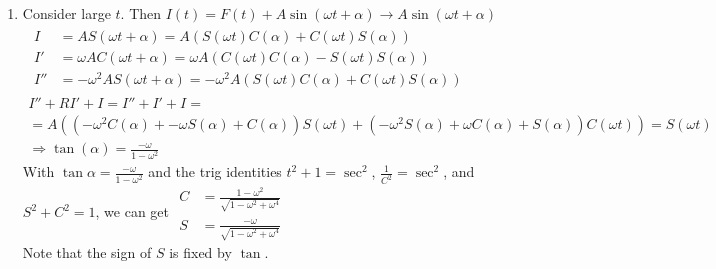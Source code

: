 \documentclass[twoside]{amsart}
\theoremstyle{plain}
\theoremstyle{definition}
\newcommand{\exercisehead}[1]
  {\smallskip
   \noindent{\small\bf Exercise #1.}}
\begin{document}
\exercisehead{9} 
\begin{enumerate}
  \item Consider large $t$.  Then $I(t) = F(t) + A \sin{ (\omega t + \alpha) } \to A \sin{ (\omega t + \alpha) }$
\[
\begin{gathered}
\begin{aligned}
  I & = A S(\omega t + \alpha )  = A ( S(\omega t ) C(\alpha ) + C(\omega t) S(\alpha ) ) \\
  I' & = \omega A C(\omega t + \alpha )  = \omega A ( C(\omega t ) C(\alpha ) - S(\omega t) S(\alpha ) ) \\
  I'' & = -\omega^2 A S(\omega t + \alpha)  = -\omega^2 A ( S(\omega t ) C(\alpha) + C(\omega t) S(\alpha) ) 
\end{aligned} \\
I'' + RI' + I = I'' + I' + I = \\
= A ((-\omega^2 C(\alpha) + - \omega S(\alpha) + C(\alpha) )S(\omega t) + (-\omega^2 S(\alpha) + \omega C(\alpha) + S(\alpha) ) C(\omega t) ) = S(\omega t ) \\
\Longrightarrow \tan{ (\alpha) } = \frac{-\omega }{1 - \omega^2 }  
\end{gathered}
\]
With $\tan{\alpha} = \frac{-\omega}{ 1 - \omega^2}$ and the trig identities $t^2 + 1 = \sec^2$, $\frac{1}{C^2} = \sec^2$, and $S^2 + C^2 = 1$, we can get  $\begin{aligned}
  C & = \frac{ 1 - \omega^2 }{ \sqrt{ 1 - \omega^2 + \omega^4} } \\
  S & = \frac{ - \omega}{ \sqrt{ 1 - \omega^2 + \omega^4 }}
\end{aligned}$ \\
Note that the sign of $S$ is fixed by $\tan$.  


\end{enumerate}
\end{document}
